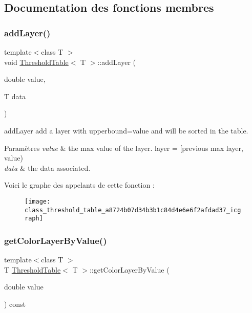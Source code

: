 \subsection{Documentation des fonctions membres}
\mbox{\label{class_threshold_table_a8724b07d34b3b1c84d4e6e6f2afdad37}} 
\subsubsection{\texorpdfstring{add\+Layer()}{addLayer()}}
{\footnotesize\ttfamily template$<$class T $>$ \\
void \hyperlink{class_threshold_table}{Threshold\+Table}$<$ T $>$\+::add\+Layer (\begin{DoxyParamCaption}\item[{double}]{value,  }\item[{T}]{data }\end{DoxyParamCaption})\hspace{0.3cm}{\ttfamily [inline]}}



add\+Layer add a layer with upperbound=value and will be sorted in the table. 


\begin{DoxyParams}{Paramètres}
{\em value} & the max value of the layer. layer = \mbox{[}previous max layer, value) \\
\hline
{\em data} & the data associated. \\
\hline
\end{DoxyParams}
Voici le graphe des appelants de cette fonction \+:\nopagebreak
\begin{figure}[H]
\begin{center}
\leavevmode
\texttt{[image: class\_threshold\_table\_a8724b07d34b3b1c84d4e6e6f2afdad37\_icgraph]}
\end{center}
\end{figure}
\mbox{\label{class_threshold_table_a35e7219d9476c3a5c0362e80ab7f5596}} 
\subsubsection{\texorpdfstring{get\+Color\+Layer\+By\+Value()}{getColorLayerByValue()}}
{\footnotesize\ttfamily template$<$class T $>$ \\
T \hyperlink{class_threshold_table}{Threshold\+Table}$<$ T $>$\+::get\+Color\+Layer\+By\+Value (\begin{DoxyParamCaption}\item[{double}]{value }\end{DoxyParamCaption}) const\hspace{0.3cm}{\ttfamily [inline]}}




